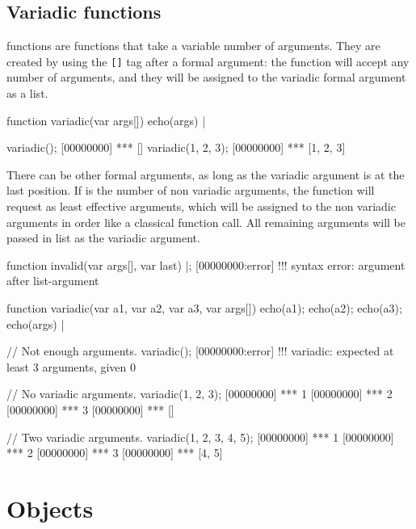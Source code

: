 \subsection{Variadic functions}
\label{sec:us-fun-variadic}

 functions are functions that take a variable number of
arguments. They are created by using the \lstinline|[]| tag after a
formal argument: the function will accept any number of arguments, and
they will be assigned to the variadic formal argument as a list.

\begin{urbiscript}
function variadic(var args[])
{
  echo(args)
} |

variadic();
[00000000] *** []
variadic(1, 2, 3);
[00000000] *** [1, 2, 3]
\end{urbiscript}

There can be other formal arguments, as long as the variadic argument is at
the last position. If  is the number of non variadic arguments, the
function will request as least  effective arguments, which will be
assigned to the non variadic arguments in order like a classical function
call. All remaining arguments will be passed in list as the variadic
argument.

\begin{comment}
\begin{urbiscript}
removeSlot("variadic")|;
\end{urbiscript}
\end{comment}

\begin{urbiscript}
function invalid(var args[], var last)
{} |;
[00000000:error] !!! syntax error: argument after list-argument

function variadic(var a1, var a2, var a3, var args[])
{
  echo(a1);
  echo(a2);
  echo(a3);
  echo(args)
} |

// Not enough arguments.
variadic();
[00000000:error] !!! variadic: expected at least 3 arguments, given 0

// No variadic arguments.
variadic(1, 2, 3);
[00000000] *** 1
[00000000] *** 2
[00000000] *** 3
[00000000] *** []

// Two variadic arguments.
variadic(1, 2, 3, 4, 5);
[00000000] *** 1
[00000000] *** 2
[00000000] *** 3
[00000000] *** [4, 5]
\end{urbiscript}



\section{Objects}


